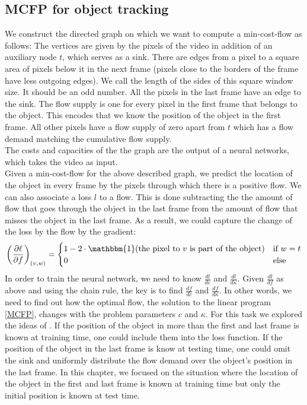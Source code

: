\documentclass{article}
\begin{document}
\subsection{MCFP for object tracking}\label{MCFP for tracking}
We construct the directed graph on which we want to compute a min-cost-flow as follows: The vertices are given by the pixels of the video in addition of an auxiliary node $t$, which serves as a sink. There are edges from a pixel to a square area of pixels below it in the next frame (pixels close to the borders of the frame have less outgoing edges). We call the length of the sides of this square window size. It should be an odd number. All the pixels in the last frame have an edge to the sink. The flow supply is one for every pixel in the first frame that belongs to the object. This encodes that we know the position of the object in the first frame. All other pixels have a flow supply of zero apart from $t$ which has a flow demand matching the cumulative flow supply.\\
The costs and capacities of the the graph are the output of a neural networks, which takes the video as input. \\
Given a min-cost-flow for the above described graph, we predict the location of the object in every frame by the pixels through which there is a positive flow. We can also associate a loss $l$ to a flow. This is done subtracting the the amount of flow that goes through the object in the last frame from the amount of flow that misses the object in the last frame. As a result, we could capture the change of the loss by the flow by the gradient:
\begin{align}\label{loss}
\left(\frac{\partial \ell}{\partial f}\right)_{(v,w)} = 
\begin{cases}
 1-2\cdot\mathbbm{1}(\textnormal{the pixel to } v \textnormal{ is part of the object}) &\text{if } w = t\\
 0 &\text{else}
\end{cases}
\end{align}
In order to train the neural network, we need to know $\frac{dl}{dc}$ and $\frac{dl}{d\kappa}$. Given $\frac{dl}{df}$ as above and using the chain rule, the key is to find $\frac{df}{dc}$ and $\frac{df}{d\kappa}$. In other words, we need to find out how the optimal flow, the solution to the linear program \ref{MCFP}, changes with the problem parameters $c$ and $\kappa$. For this task we explored the ideas of \cite{AmosK17}. If the position of the object in more than the first and last frame is known at training time, one could include them into the loss function. If the position of the object in the last frame is know at testing time, one could omit the sink and uniformly distribute the flow demand over the object's position in the last frame. In this chapter, we focused on the situation where the location of the object in the first and last frame is known at training time but only the initial position is known at test time.
\end{document}
